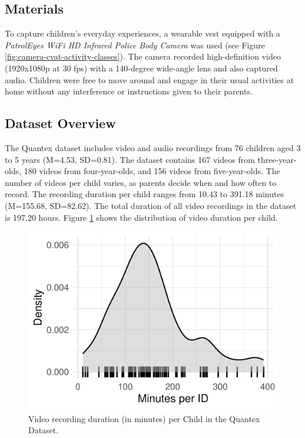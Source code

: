 \documentclass[
  man,floatsintext]{apa6}
\begin{document}
\subsection{Materials}\label{materials}

To capture children's everyday experiences, a wearable vest equipped with a \emph{PatrolEyes WiFi HD Infrared Police Body Camera} was used (see Figure \ref{fig:camera-cvat-activity-classes}). The camera recorded high-definition video (1920x1080p at 30 fps) with a 140-degree wide-angle lens and also captured audio. Children were free to move around and engage in their usual activities at home without any interference or instructions given to their parents.

\subsection{Dataset Overview}\label{dataset}

The Quantex dataset includes video and audio recordings from 76 children aged 3 to 5 years (M=4.53, SD=0.81). The dataset contains 167 videos from three-year-olds, 180 videos from four-year-olds, and 156 videos from five-year-olds. The number of videos per child varies, as parents decide when and how often to record. The recording duration per child ranges from 10.43 to 391.18 minutes (M=155.68, SD=82.62). The total duration of all video recordings in the dataset is 197.20 hours. Figure \ref{fig:quantex-minutes-per-child} shows the distribution of video duration per child.

\begin{figure}

{\centering \includegraphics{Quantex_interaction_paper_files/figure-latex/quantex-minutes-per-child-1} 

}

\caption{Video recording duration (in minutes) per Child in the Quantex Dataset.}\label{fig:quantex-minutes-per-child}
\end{figure}
\end{document}
